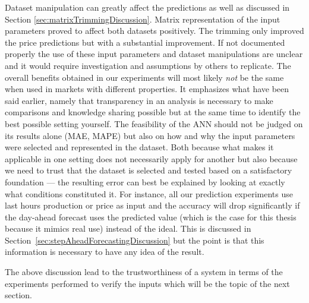Dataset manipulation can greatly affect the predictions as well as discussed in Section \ref{sec:matrixTrimmingDiscussion}. Matrix representation of the input parameters proved to affect both datasets positively. The trimming only improved the price predictions but with a substantial improvement. If not documented properly the use of these input parameters and dataset manipulations are unclear and it would require investigation and assumptions by others to replicate. The overall benefits obtained in our experiments will most likely \emph{not} be the same when used in markets with different properties. It emphasizes what have been said earlier, namely that transparency in an analysis is necessary to make comparisons and knowledge sharing possible but at the same time to identify the best possible setting yourself. The feasibility of the ANN should not be judged on its results alone (MAE, MAPE) but also on how and why the input parameters were selected and represented in the dataset. Both because what makes it applicable in one setting does not necessarily apply for another but also because we need to trust that the dataset is selected and tested based on a satisfactory foundation --- the resulting error can best be explained by looking at exactly what conditions constituted it. For instance, all our prediction experiments use last hours production or price as input and the accuracy will drop significantly if the day-ahead forecast uses the predicted value (which is the case for this thesis because it mimics real use) instead of the ideal. This is discussed in Section~\ref{sec:stepAheadForecastingDiscussion} but the point is that this information is necessary to have any idea of the result. 

The above discussion lead to the trustworthiness of a system in terms of the experiments performed to verify the inputs which will be the topic of the next section.  

